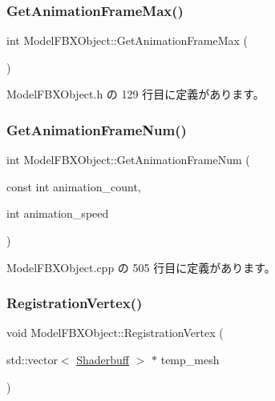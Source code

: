 \subsubsection{\texorpdfstring{Get\+Animation\+Frame\+Max()}{GetAnimationFrameMax()}}
{\footnotesize\ttfamily int Model\+F\+B\+X\+Object\+::\+Get\+Animation\+Frame\+Max (\begin{DoxyParamCaption}{ }\end{DoxyParamCaption})\hspace{0.3cm}{\ttfamily [inline]}}



 Model\+F\+B\+X\+Object.\+h の 129 行目に定義があります。

\mbox{\label{class_model_f_b_x_object_a87516b4e5aa6341188e47f956d4a180f}} 
\subsubsection{\texorpdfstring{Get\+Animation\+Frame\+Num()}{GetAnimationFrameNum()}}
{\footnotesize\ttfamily int Model\+F\+B\+X\+Object\+::\+Get\+Animation\+Frame\+Num (\begin{DoxyParamCaption}\item[{const int}]{animation\+\_\+count,  }\item[{int}]{animation\+\_\+speed }\end{DoxyParamCaption})}



 Model\+F\+B\+X\+Object.\+cpp の 505 行目に定義があります。

\mbox{\label{class_model_f_b_x_object_aa74ce889c6840f2a9d0fa54b420b9e2d}} 
\subsubsection{\texorpdfstring{Registration\+Vertex()}{RegistrationVertex()}}
{\footnotesize\ttfamily void Model\+F\+B\+X\+Object\+::\+Registration\+Vertex (\begin{DoxyParamCaption}\item[{std\+::vector$<$ \mbox{\hyperlink{struct_model_f_b_x_object_1_1_shaderbuff}{Shaderbuff}} $>$ $\ast$}]{temp\+\_\+mesh }\end{DoxyParamCaption})\hspace{0.3cm}{\ttfamily [private]}}



